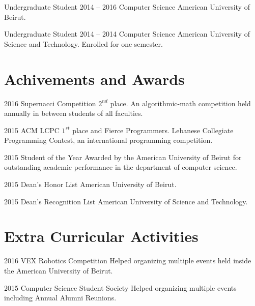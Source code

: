 \documentclass{tccv}
\begin{document}
\begin{yearlist}

\item[Undergraduate Student]{2014 -- 2016}
     {Computer Science} 
     {American University of Beirut.}


\item[Undergraduate Student]{2014 -- 2014}
     {Computer Science} 
     {American University of Science and Technology. Enrolled for one semester.}

\end{yearlist}



\section{Achivements and Awards}

\begin{yearlist}

\item{2016}
     {Supernacci Competition}
     {$2^{nd}$ place. An algorithmic-math competition held annually in between students of all faculties.}

\item{2015}
     {ACM LCPC}
     {$1^{st}$ place and Fierce Programmers. Lebanese Collegiate Programming Contest, an international programming competition.}

\item{2015}
     {Student of the Year}
     {Awarded by the American University of Beirut for outstanding academic performance in the department of computer science.}

\item{2015}
     {Dean's Honor List}
     {American University of Beirut.}

\item{2015}
     {Dean's Recognition List}
     {American University of Science and Technology.}

\end{yearlist}

\section{Extra Curricular Activities}
\begin{yearlist}
\item{2016}
     {VEX Robotics Competition}
     {Helped organizing multiple events held inside the American University of Beirut.}


\item{2015}
     {Computer Science Student Society}
     {Helped organizing multiple events including Annual Alumni Reunions.}

\end{yearlist}
\end{document}
